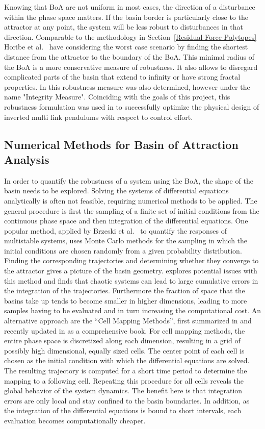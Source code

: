 Knowing that BoA are not uniform in most cases, the direction of a disturbance within the phase space matters. If the basin border is particularly close to the attractor at any point, the system will be less robust to disturbances in that direction. Comparable to the methodology in Section~\ref{Residual Force Polytopes} Horibe et al.\ \cite{quant} have considering the worst case scenario by finding the shortest distance from the attractor to the boundary of the BoA.
This minimal radius of the BoA is a more conservative measure of robustness. It also allows to disregard complicated parts of the basin that extend to infinity or have strong fractal properties. In \cite{integr} this robustness measure was also determined, however under the name "Integrity Measure".
Coinciding with the goals of this project, this robustness formulation was used in  \cite{quant} to successfully optimize the physical design of inverted multi link pendulums with respect to control effort.
 
\subsection{Numerical Methods for Basin of Attraction Analysis} \label{Numerical Methods}
In order to quantify the robustness of a system using the BoA, the shape of the basin needs to be explored. Solving the systems of differential equations analytically is often not feasible, requiring numerical methods to be applied. The general procedure is first the sampling of a finite set of initial conditions from the continuous phase space and then integration of the differential equations. One popular method, applied by Brzeski et al.\ \cite{multistable} to quantify the responses of multistable systems, uses Monte Carlo methods for the sampling in which the initial conditions are chosen randomly from a given probability distribution. Finding the corresponding trajectories and determining whether they converge to the attractor gives a picture of the basin geometry. \cite{limitsBoA} explores potential issues with this method and finds that chaotic systems can lead to large cumulative errors in the integration of the trajectories. Furthermore the fraction of space that the basins take up tends to become smaller in higher dimensions, leading to more samples having to be evaluated and in turn increasing the computational cost.
An alternative approach are the “Cell Mapping Methods”, first summarized in \cite{cell1} and recently updated in \cite{cell2} as a comprehensive book. For cell mapping methods, the entire phase space is discretized along each dimension, resulting in a grid of possibly high dimensional, equally sized cells. The center point of each cell is chosen as the initial condition with which the differential equations are solved. The resulting trajectory is computed for a short time period to determine the mapping to a following cell. Repeating this procedure for all cells reveals the global behavior of the system dynamics. The benefit here is that integration errors are only local and stay confined to the basin boundaries. In addition, as the integration of the differential equations is bound to short intervals, each evaluation becomes computationally cheaper.

